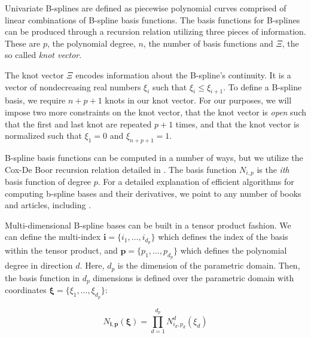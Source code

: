 \documentclass[../background.tex]{subfiles}
\begin{document}
Univariate B-splines are defined as piecewise polynomial curves comprised of linear combinations of B-spline basis functions. The basis functions for B-splines can be produced through a recursion relation utilizing three pieces of information. These are $p$, the polynomial degree, $n$, the number of basis functions and $\Xi$, the so called \textit{knot vector}. 

The knot vector $\Xi$ encodes information about the B-spline's continuity. It is a vector of nondecreasing real numbers $\xi_i$ such that $\xi_i \leq \xi_{i+1}$. To define a B-spline basis, we require $n+p+1$ knots in our knot vector. For our purposes, we will impose two more constraints on the knot vector, that the knot vector is \textit{open} such that the first and last knot are repeated $p+1$ times, and that the knot vector is normalized such that $\xi_1 = 0$ and $\xi_{n+p+1} = 1$.

B-spline basis functions can be computed in a number of ways, but we utilize the Cox-De Boor recursion relation detailed in \cite{de_boor_calculating_1972}. The basis function $N_{i,p}$ is the \textit{ith} basis function of degree $p$. For a detailed explanation of efficient algorithms for computing b-spline bases and their derivatives, we point to any number of books and articles, including \cite{piegl_nurbs_2012,austin_cottrell_isogeometric_2009}.

Multi-dimensional B-spline bases can be built in a tensor product fashion. We can define the multi-index $\mathbf{i} = \{i_1,\dots,i_{d_p}\}$ which defines the index of the basis within the tensor product, and $\mathbf{p} = \{p_1,\dots, p_{d_p}\}$ which defines the polynomial degree in direction $d$. Here, $d_p$ is the dimension of the parametric domain. Then, the basis function in $d_p$ dimensions is defined over the parametric domain with coordinates $\boldsymbol{\xi} = \{\xi_1,\dots, \xi_{d_p}\}$:

\begin{equation}
N_{\mathbf{i},\mathbf{p}}(\boldsymbol{\xi}) = \prod_{d=1}^{d_p} N^d_{i_d, p_d}(\xi_d)
\end{equation}
\end{document}
